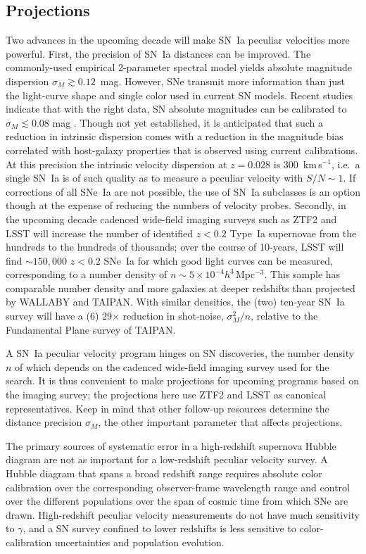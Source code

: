 \subsection{Projections}
Two advances in the upcoming decade will make SN~Ia peculiar velocities more powerful.
First, the precision of SN~Ia distances can be improved.  The commonly-used empirical 2-parameter spectral model yields  absolute magnitude
dispersion $\sigma_M \gtrsim 0.12$~mag.  However, SNe transmit more information than just the light-curve shape and single color used in current SN models.
Recent studies indicate that with the right data, SN absolute
magnitudes can be calibrated to $\sigma_M \lesssim 0.08$ mag \citep[see e.g.][]{2012MNRAS.425.1007B, 2015ApJ...815...58F}. 
Though not yet
established, it is anticipated that such a reduction in intrinsic dispersion comes with a reduction in the magnitude bias correlated with host-galaxy properties
that is observed using current calibrations.  At this precision the intrinsic velocity dispersion  at $z=0.028$ is  $300$~km\,s$^{-1}$, i.e.\ a single SN~Ia  is of such quality as to
measure a peculiar velocity with $S/N \sim 1$.
 If corrections of all SNe~Ia are not possible, the use of SN~Ia subclasses is an option though at the expense of reducing the
numbers of velocity probes.
Secondly,  in the upcoming decade cadenced wide-field imaging surveys such as ZTF2 and LSST
  will increase the number of identified  $z<0.2$ Type~Ia supernovae from the hundreds to the
hundreds of thousands; over the course of 10-years, LSST will find $\sim150,000$ $z<0.2$ SNe~Ia
 for which good light curves can be measured, corresponding to a  number density of $n \sim 5\times 10^{-4}h^3$\,Mpc$^{-3}$.
  This sample has comparable
 number density and more galaxies at deeper redshifts than projected by WALLABY and TAIPAN.  With similar densities,
 the (two) ten-year SN~Ia survey will have
 a (6) 29$\times$ reduction in shot-noise, $\sigma^2_M/n$, relative to the Fundamental Plane survey of TAIPAN.

A SN~Ia peculiar velocity program hinges on  SN discoveries, the number density $n$ of which
depends on the cadenced wide-field imaging survey used for the search.    
It is thus convenient to make projections for upcoming programs
based on the imaging survey; the projections here use ZTF2 and LSST 
as canonical representatives.
Keep in mind that other follow-up resources determine the distance precision $\sigma_M$, the other important parameter
that affects projections.


The primary sources of systematic error in a high-redshift supernova Hubble diagram are not as important for a low-redshift
peculiar velocity survey.  A Hubble diagram that spans a broad redshift range requires absolute color calibration over the corresponding observer-frame
wavelength range and control over the different populations over the span of cosmic time from which SNe are drawn.  High-redshift peculiar
velocity measurements do not have much sensitivity to $\gamma$, and a SN survey confined to lower redshifts is less sensitive to
color-calibration uncertainties and population evolution.

